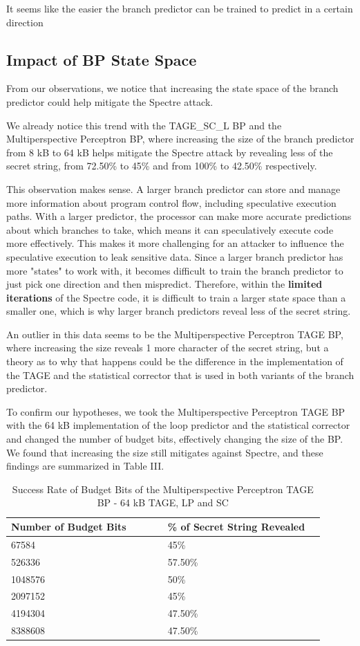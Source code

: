 \documentclass[twocolumn,showpacs,%
  nofootinbib,aps,superscriptaddress,%
  eqsecnum,prd,notitlepage,showkeys,10pt]{revtex4-1}
\begin{document}
It seems like the easier the branch predictor can be trained to predict in a certain direction

\subsection{Impact of BP State Space}

From our observations, we notice that increasing the state space of the branch predictor could help mitigate the Spectre attack.

We already notice this trend with the TAGE\_SC\_L BP and the Multiperspective Perceptron BP, where increasing the size of the branch predictor from 8 kB to 64 kB helps mitigate the Spectre attack by revealing less of the secret string, from 72.50\% to 45\% and from 100\% to 42.50\% respectively.

This observation makes sense. A larger branch predictor can store and manage more information about program control flow, including speculative execution paths. With a larger predictor, the processor can make more accurate predictions about which branches to take, which means it can speculatively execute code more effectively. This makes it more challenging for an attacker to influence the speculative execution to leak sensitive data. Since a larger branch predictor has more "states" to work with, it becomes difficult to train the branch predictor to just pick one direction and then mispredict. Therefore, within the \textbf{limited iterations} of the Spectre code, it is difficult to train a larger state space than a smaller one, which is why larger branch predictors reveal less of the secret string. 

An outlier in this data seems to be the Multiperspective Perceptron TAGE BP, where increasing the size reveals 1 more character of the secret string, but a theory as to why that happens could be the difference in the implementation of the TAGE and the statistical corrector that is used in both variants of the branch predictor.

To confirm our hypotheses, we took the Multiperspective Perceptron TAGE BP with the 64 kB implementation of the loop predictor and the statistical corrector and changed the number of budget bits, effectively changing the size of the BP. We found that increasing the size still mitigates against Spectre, and these findings are summarized in Table III.

\begin{table}
\centering
\caption{Success Rate of Budget Bits of the Multiperspective Perceptron TAGE BP - 64 kB TAGE, LP and SC}
\small
\begin{tabular}{p{0.45\linewidth}p{0.45\linewidth}}
\hline
Number of Budget Bits & \% of Secret String Revealed \\
\hline
67584 & 45\% \\
526336 & 57.50\% \\
1048576 & 50\% \\
2097152 & 45\% \\
4194304 & 47.50\% \\
8388608 & 47.50\% \\
\hline
\end{tabular}
\end{table}
\end{document}
